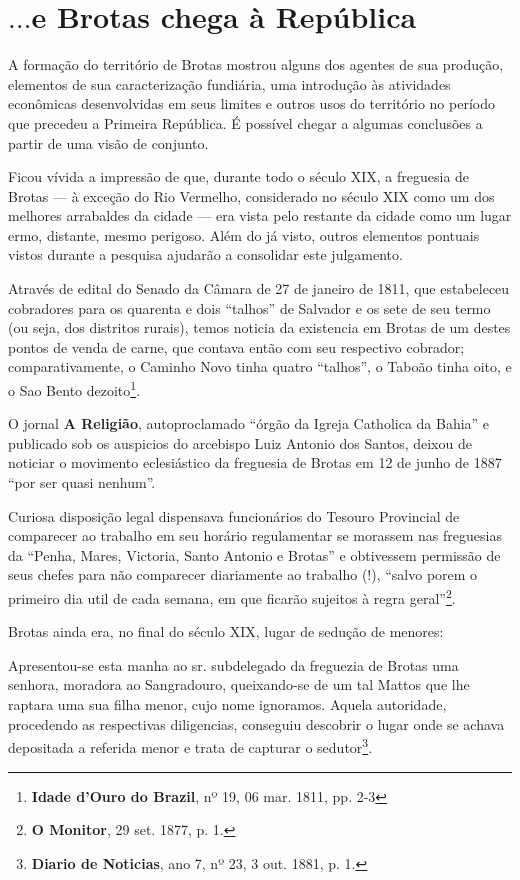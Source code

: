 \section{\(\dots\)e Brotas chega à República}\label{sec:conccap2}

A formação do território de Brotas mostrou alguns dos agentes de sua produção, elementos de sua caracterização fundiária, uma introdução às atividades econômicas desenvolvidas em seus limites e outros usos do território no período que precedeu a Primeira República. É possível chegar a algumas conclusões a partir de uma visão de conjunto.

Ficou vívida a impressão de que, durante todo o século XIX, a freguesia de Brotas --- à exceção do Rio Vermelho, considerado no século XIX como um dos melhores arrabaldes da cidade --- era vista pelo restante da cidade como um lugar ermo, distante, mesmo perigoso. Além do já visto, outros elementos pontuais vistos durante a pesquisa ajudarão a consolidar este julgamento.

Através de edital do Senado da Câmara de 27 de janeiro de 1811, que estabeleceu cobradores para os quarenta e dois ``talhos'' de Salvador e os sete de seu termo (ou seja, dos distritos rurais), temos noticia da existencia em Brotas de um destes pontos de venda de carne, que contava então com seu respectivo cobrador; comparativamente, o Caminho Novo tinha quatro ``talhos'', o Taboão tinha oito, e o Sao Bento dezoito\footnote{\textbf{Idade d'Ouro do Brazil}, nº 19, 06 mar. 1811, pp. 2-3}.

O jornal \textbf{A Religião}, autoproclamado ``órgão da Igreja Catholica da Bahia'' e publicado sob os auspicios do arcebispo Luiz Antonio dos Santos, deixou de noticiar o movimento eclesiástico da freguesia de Brotas em 12 de junho de 1887 ``por ser quasi nenhum''.

Curiosa disposição legal dispensava funcionários do Tesouro Provincial de comparecer ao trabalho em seu horário regulamentar se morassem nas freguesias da ``Penha, Mares, Victoria, Santo Antonio e Brotas'' e obtivessem permissão de seus chefes para não comparecer diariamente ao trabalho (!), ``salvo porem o primeiro dia util de cada semana, em que ficarão sujeitos à regra geral''\footnote{\textbf{O Monitor}, 29 set. 1877, p. 1.}.

Brotas ainda era, no final do século XIX, lugar de sedução de menores:

\begin{citacao}
Apresentou-se esta manha ao sr. subdelegado da freguezia de Brotas uma senhora, moradora ao Sangradouro, queixando-se de um tal Mattos que lhe raptara uma sua filha menor, cujo nome ignoramos. Aquela autoridade, procedendo as respectivas diligencias, conseguiu descobrir o lugar onde se achava depositada a referida menor e trata de capturar o sedutor\footnote{ \textbf{Diario de Noticias}, ano 7, nº 23, 3 out. 1881, p. 1.}.
\end{citacao}


